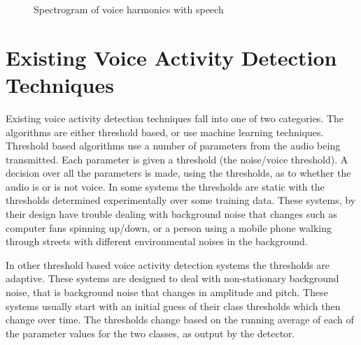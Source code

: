 \documentclass[ %
                    author={Sam Phippen},
                supervisor={Dr. Rafal Bogacz},
                     title={Real time voice activity detectors in noisy personal computing environments},
                  subtitle={},
                    degree={MEng},
                      year={2012} ]{thesis}
\begin{document}
\begin{figure}
    \caption{Spectrogram of voice harmonics with speech}
    \label{img:spectrogram}
\end{figure}

\section{Existing Voice Activity Detection Techniques}

Existing voice activity detection techniques fall into one of two categories.
The algorithms are either threshold based, or use machine learning techniques.
Threshold based algorithms use a number of parameters from the audio being
transmitted. Each parameter is given a threshold (the noise/voice threshold). A
decision over all the parameters is made, using the thresholds, as to whether
the audio is or is not voice. In some systems the thresholds are static with
the thresholds determined experimentally over some training data\cite{haigh}.
These systems, by their design have trouble dealing with background noise that
changes such as computer fans spinning up/down, or a person using a mobile
phone walking through streets with different environmental noises in the
background.

In other threshold based voice activity detection systems the thresholds are
adaptive\cite{gokhun}. These systems are designed to deal with non-stationary
background noise, that is background noise that changes in amplitude and pitch.
These systems usually start with an initial guess of their class thresholds
which then change over time. The thresholds change based on the running average
of each of the parameter values for the two classes, as output by the
detector\cite{sakhnov}.
\end{document}
